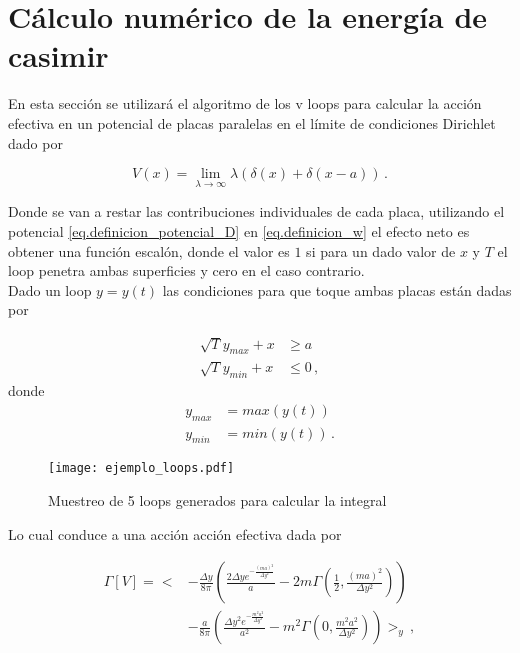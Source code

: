 \section{Cálculo numérico de la energía de casimir}


En esta sección se utilizará el algoritmo de los v loops para calcular la acción efectiva en un potencial de placas paralelas en el límite de condiciones Dirichlet dado por

\begin{equation}
V(x) = \lim _{\lambda \rightarrow \infty} \lambda \left( \delta (x) + \delta ( x - a) \right)
\, .
\label{eq.definicion_potencial_D}
\end{equation}

Donde se van a restar las contribuciones individuales de cada placa, utilizando el potencial \eqref{eq.definicion_potencial_D} en \eqref{eq.definicion_w} el efecto neto es obtener una función escalón, donde el valor es $1$ si para un dado valor de $x$ y $T$ el loop penetra ambas superficies y cero en el caso contrario. \\


Dado un loop $y = y(t)$ las condiciones para que toque ambas placas están dadas por

\begin{align}
\label{condiciones}
\sqrt{T} y_{max} + x & \geq a \\
\sqrt{T} y_{min} + x & \leq 0 \, ,
\nonumber
\end{align}
donde 
\begin{align*}
y_{max}  &= max(y(t)) \\
y_{min}  &= min(y(t)) \, .
\end{align*}




\begin{figure}
    \centering
    \texttt{[image: ejemplo\_loops.pdf]}
    \caption{Muestreo de 5 loops generados para calcular la integral}
    \label{fig:ejemplo_loops}
\end{figure}



Lo cual conduce a una acción acción efectiva dada por

\begin{align}
\label{ec1.accion_efectiva}
\Gamma \left[ V \right] = 
 \Bigg<
&- \frac{\Delta y}{8 \pi}
	\left(
		\frac{2 \Delta y e^{-\frac{(m a)^2}{\Delta y ^2}}}{a}
		-2 m \Gamma \left( \frac{1}{2}, \frac{(m a)^2}{\Delta y ^2} \right)
	\right) \\
	&-  \frac{a}{8 \pi}
	\left(
		\frac{\Delta y ^2 e^{-\frac{m^2 a^2}{\Delta y^2}}}{a^2} -
		m^2 \Gamma \left( 0, \frac{m^2 a^2}{\Delta y ^2} \right)
	\right)	
\Bigg> _{y} 
\, ,
\nonumber
\end{align}

